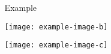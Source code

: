\documentclass[final]{beamer}
\newlength{\sepwid}
\newlength{\onecolwid}
\begin{document}
\begin{frame}[t]
\begin{columns}[t]
\begin{column}{\onecolwid}
\end{column} %
\hspace{\sepwid}
\begin{column}{\onecolwid} %
    
    \begin{block}{Example}
    
        \begin{center}
            \texttt{[image: example-image-b]}
            \vspace{1em}

            \texttt{[image: example-image-c]}
            \vfill
        \end{center}   
    
    \end{block}
\end{column}
\end{columns} %

\end{frame} %
\end{document}

